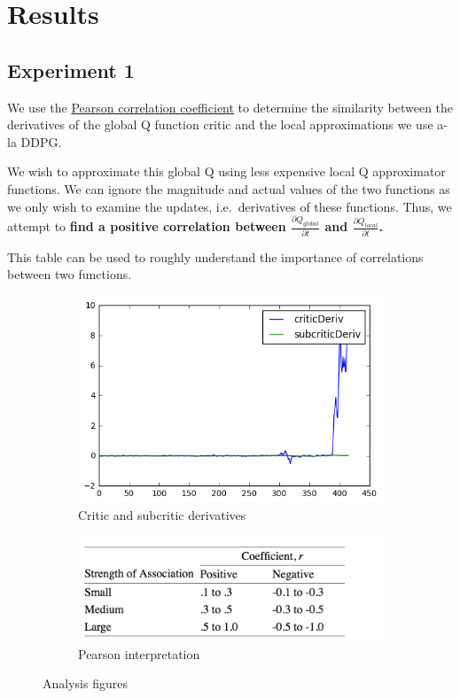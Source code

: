 \section{Results}

\subsection{Experiment 1}

We use the
\href{https://statistics.laerd.com/statistical-guides/pearson-correlation-coefficient-statistical-guide.php}{Pearson
correlation coefficient} to determine the similarity between the
derivatives of the global Q function critic and the local approximations
we use a-la DDPG.

We wish to approximate this global Q using less expensive local Q approximator functions. We can ignore the magnitude and actual values of the two functions as we only wish to examine the updates, i.e.~derivatives of these functions. Thus,
we attempt to \textbf{find a positive correlation between
\(\frac{\partial Q_{global}}{\partial t}\) and
\(\frac{\partial Q_{local}}{\partial t}\).}

This table can be used to roughly understand
the importance of correlations between two functions.

\begin{figure}[h]
\centering
\begin{subfigure}{.5\textwidth}
  \centering
  \includegraphics[width=.6\linewidth]{exp1_analysis_1_1.png}
  \caption{Critic and subcritic derivatives}
  \label{fig:sub1}
\end{subfigure}%
\begin{subfigure}{.5\textwidth}
  \centering
  \includegraphics[width=.6\linewidth]{pearson_table.png}
  \caption{Pearson interpretation}
  \label{fig:sub2}
\end{subfigure}
\caption{Analysis figures}
\label{fig:test}
\end{figure}

